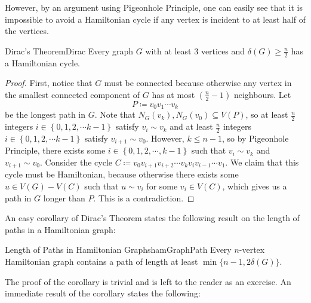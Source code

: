 \documentclass[math, code]{amznotes}
\theoremstyle{remark}
\begin{document}
However, by an argument using Pigeonhole Principle, one can easily see that it is impossible to avoid a Hamiltonian cycle if any vertex is incident to at least half of the vertices.
\begin{thmbox}{Dirac's Theorem}{Dirac}
    Every graph $G$ with at least $3$ vertices and $\delta(G) \geq \frac{n}{2}$ has a Hamiltonian cycle.
    \tcblower
    \begin{proof}
        First, notice that $G$ must be connected because otherwise any vertex in the smallest connected component of $G$ has at most $\left(\frac{n}{2} - 1\right)$ neighbours. Let 
        \begin{equation*}
            P \coloneqq v_0v_1\cdots v_k
        \end{equation*}
        be the longest path in $G$. Note that $N_G(v_k), N_G(v_0) \subseteq V(P)$, so at least $\frac{n}{2}$ integers $i \in \left\{0, 1, 2, \cdots k - 1\right\}$ satisfy $v_i \sim v_k$ and at least $\frac{n}{2}$ integers $i \in \left\{0, 1, 2, \cdots k - 1\right\}$ satisfy $v_{i + 1} \sim v_0$. However, $k \leq n - 1$, so by Pigeonhole Principle, there exists some $i \in \left\{0, 1, 2, \cdots, k - 1\right\}$ such that $v_i \sim v_k$ and $v_{i + 1} \sim v_0$. Consider the cycle $C \coloneqq v_0v_{i + 1}v_{i + 2}\cdots v_kv_iv_{i - 1}\cdots v_1$. We claim that this cycle must be Hamiltonian, because otherwise there exists some $u \in V(G) - V(C)$ such that $u \sim v_i$ for some $v_i \in V(C)$, which gives us a path in $G$ longer than $P$. This is a contradiction.
    \end{proof}
\end{thmbox}
An easy corollary of Dirac's Theorem states the following result on the length of paths in a Hamiltonian graph:
\begin{corbox}{Length of Paths in Hamiltonian Graphs}{hamGraphPath}
    Every $n$-vertex Hamiltonian graph contains a path of length at least $\min\{n - 1, 2\delta(G)\}$.
\end{corbox}
The proof of the corollary is trivial and is left to the reader as an exercise. An immediate result of the corollary states the following:
\end{document}
